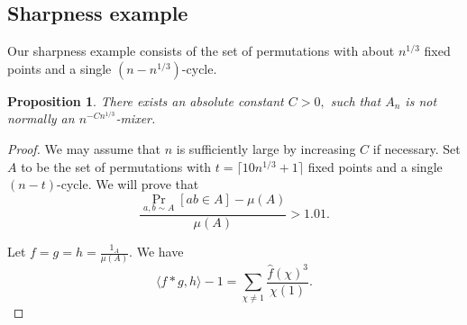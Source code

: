 \documentclass[11pt, letterpaper]{amsart}
\newtheorem{proposition}[thm]{Proposition}
\begin{document}
\subsection{Sharpness example}

Our sharpness example consists of the set of permutations with about $n^{1/3}$ fixed points and a single $(n-n^{1/3})$-cycle. 




\begin{proposition}\label{Prop:not a mixer}
    There exists an absolute constant $C>0,$ such that $A_n$ is not normally an $n^{-Cn^{1/3}}$-mixer.
\end{proposition}
\begin{proof} We may assume that $n$ is sufficiently large by increasing $C$ if necessary. Set  $A$ to be the set of permutations with $t = \lceil 10n^{1/3}+1\rceil$ fixed points and a single $(n-t)$-cycle. We will prove that 
\[
\frac{\Pr_{a,b\sim A}[ab\in A] -\mu(A)}{\mu(A)} >1.01.
\]

Let $f=g=h=\frac{1_A}{\mu(A)}$. We have \[\langle f*g,h\rangle -1 = \sum_{\chi\ne 1}\frac{\widehat{f}(\chi)^3}{\chi(1)}.\]


\end{proof}
\end{document}
